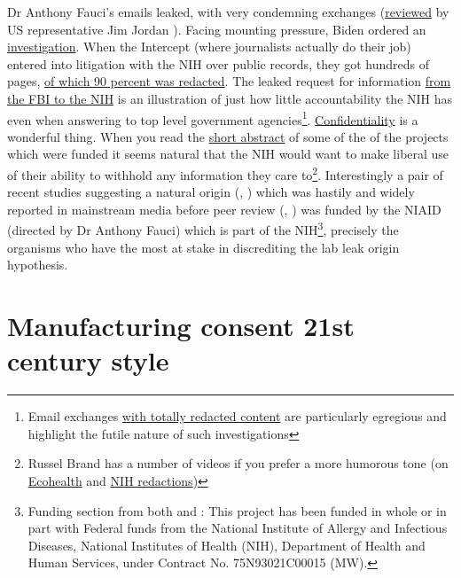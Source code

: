 \documentclass[11pt,a4paper,notitlepage]{report}
\begin{document}
Dr Anthony Fauci's emails leaked, with very condemning exchanges (\href{https://www.youtube.com/watch?v=q3F2ZJGipiE}{reviewed} by US representative Jim Jordan \cite{jimjordan29062021}). Facing mounting pressure, Biden ordered an \href{https://www.bbc.com/news/world-us-canada-57260009}{investigation}. When the Intercept (where journalists actually do their job) entered into litigation with the NIH over public records, they got hundreds of pages, \href{https://theintercept.com/2022/02/20/nih-coronavirus-research-wuhan-redacted/}{of which 90 percent was redacted}. The leaked request for information \href{https://theintercept.com/2022/01/20/coronavirus-research-china-ecohealth-fbi/}{from the FBI to the NIH} is an illustration of just how little accountability the NIH has even when answering to top level government agencies\footnote{Email exchanges \href{https://www.documentcloud.org/documents/21182424-pages-from-nih_foia_274}{with totally redacted content} are particularly egregious and highlight the futile nature of such investigations}. \href{https://grants.nih.gov/grants/policy/nihgps/html5/section_2/2.3.11_availability_and_confidentiality_of_information.htm}{Confidentiality} is a wonderful thing. When you read the \href{https://reporter.nih.gov/search/-bvPCvB7zkyvb1AjAgW5Yg/project-details/8674931}{short abstract} of some of the of the projects which were funded it seems natural that the NIH would want to make liberal use of their ability to withhold any information they care to\footnote{Russel Brand has a number of videos if you prefer a more humorous tone (on \href{https://www.youtube.com/watch?v=yTbzyirwnoQ}{Ecohealth} and \href{https://www.youtube.com/watch?v=ZNKG8d0ujwo}{NIH redactions})}. Interestingly a pair of recent studies suggesting a natural origin (\cite{pekar_jonathan_e_2022_6332858}, \cite{michael_worobey_2022_6299116}) which was hastily and widely reported in mainstream media before peer review (\cite{guardian26022022}, \cite{newyorktimes27012022}) was funded by the NIAID (directed by Dr Anthony Fauci) which is part of the NIH\footnote{Funding section from both \citet{pekar_jonathan_e_2022_6332858} and \citet{michael_worobey_2022_6299116} : This project has been funded in whole or in part with Federal funds from the National Institute of Allergy and Infectious Diseases, National Institutes of Health (NIH), Department of Health and Human Services, under Contract No. 75N93021C00015 (MW).}, precisely the organisms who have the most at stake in discrediting the lab leak origin hypothesis. 


\section*{Manufacturing consent 21st century style}
\end{document}

